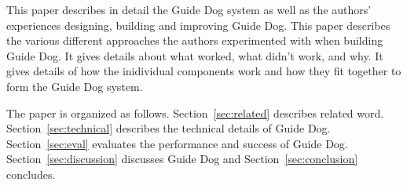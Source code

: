 This paper describes in detail the Guide Dog system as well as the authors'
experiences designing, building and improving Guide Dog. This paper describes
the various different approaches the authors experimented with when building
Guide Dog. It gives details about what worked, what didn't work, and why. It
gives details of how the inidividual components work and how they fit together
to form the Guide Dog system.

The paper is organized as follows. Section~\ref{sec:related} describes related
word. Section~\ref{sec:technical} describes the technical details of Guide Dog.
Section~\ref{sec:eval} evaluates the performance and success of Guide Dog.
Section~\ref{sec:discussion} discusses Guide Dog and
Section~\ref{sec:conclusion} concludes.
